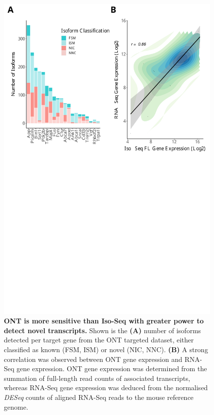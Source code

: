 \begin{figure}[!htp]
	\begin{center}
		\includegraphics[page=2,trim={0 19cm 0 0cm},clip,scale = 0.60]{Figures/ONTvsIsoSeq.pdf}
	\end{center}
	\captionsetup{width=0.95\textwidth}
	\caption[Isoform landscape of AD-associated genes from ONT targeted profiling]%
	{\textbf{ONT is more sensitive than Iso-Seq with greater power to detect novel transcripts.} Shown is the \textbf{(A)} number of isoforms detected per target gene from the ONT targeted dataset, either classified as known (FSM, ISM) or novel (NIC, NNC). \textbf{(B)} A strong correlation was observed between ONT gene expression and RNA-Seq gene expression. ONT gene expression was determined from the summation of full-length read counts of associated transcripts, whereas RNA-Seq gene expression was deduced from the normalised \textit{DESeq} counts of aligned RNA-Seq reads to the mouse reference genome\cite{Castanho2020}.}
	\label{fig:ont_targeted_finalnumberiso}
\end{figure}

